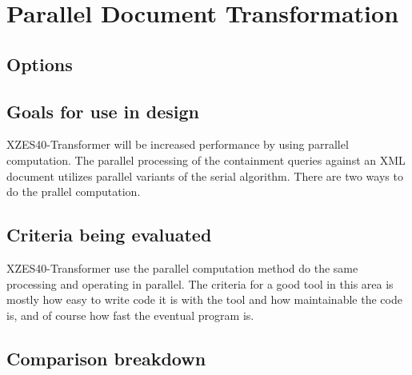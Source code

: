 \section{Parallel Document Transformation}

\subsection{Options}

\subsection{Goals for use in design}

XZES40-Transformer will be increased performance by using parrallel computation.
The parallel processing of the containment queries against an XML document utilizes parallel variants of the serial algorithm.
There are two ways to do the prallel computation.


\subsection{Criteria being evaluated}

XZES40-Transformer use the parallel computation method do the same processing and operating in parallel.
The criteria for a good tool in this area is mostly how easy to write code it is with the tool and how maintainable the code is, and of course how fast the eventual program is.

\subsection{Comparison breakdown}

